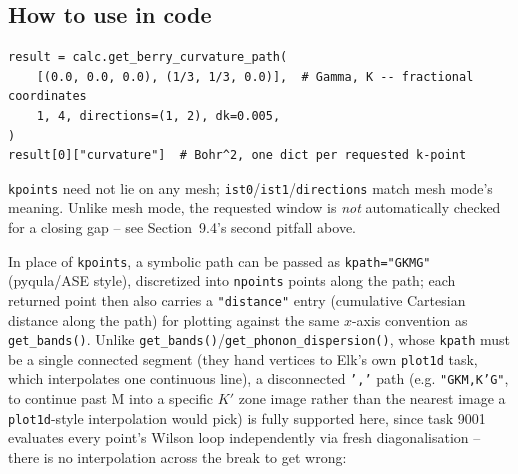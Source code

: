 \documentclass[11pt]{article}
\begin{document}

\subsection{How to use in code}

\begin{verbatim}
result = calc.get_berry_curvature_path(
    [(0.0, 0.0, 0.0), (1/3, 1/3, 0.0)],  # Gamma, K -- fractional coordinates
    1, 4, directions=(1, 2), dk=0.005,
)
result[0]["curvature"]  # Bohr^2, one dict per requested k-point
\end{verbatim}
\texttt{kpoints} need not lie on any mesh; \texttt{ist0}/\texttt{ist1}/\texttt{directions}
match mesh mode's meaning. Unlike mesh mode, the requested window is \emph{not}
automatically checked for a closing gap -- see Section~9.4's second pitfall above.

In place of \texttt{kpoints}, a symbolic path can be passed as
\texttt{kpath="GKMG"} (pyqula/ASE style), discretized into \texttt{npoints} points along
the path; each returned point then also carries a \texttt{"distance"} entry (cumulative
Cartesian distance along the path) for plotting against the same $x$-axis convention as
\texttt{get\_bands()}. Unlike \texttt{get\_bands()}/\texttt{get\_phonon\_dispersion()},
whose \texttt{kpath} must be a single connected segment (they hand vertices to Elk's own
\texttt{plot1d} task, which interpolates one continuous line), a disconnected \texttt{','}
path (e.g. \texttt{"GKM,K'G"}, to continue past M into a specific $K'$ zone image rather
than the nearest image a \texttt{plot1d}-style interpolation would pick) is fully
supported here, since task 9001 evaluates every point's Wilson loop independently via
fresh diagonalisation -- there is no interpolation across the break to get wrong:
\end{document}
